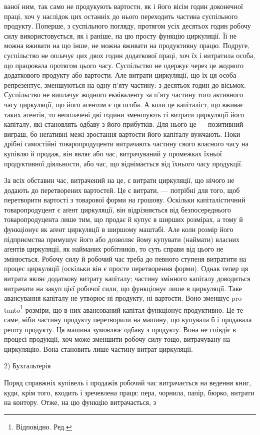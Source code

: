 ваної ним, так само не продукують вартости, як і його вісім годин
доконечної праці, хоч у наслідок цих останніх до нього переходить
частина суспільного продукту. Поперше, з суспільного погляду, протягом
усіх десятьох годин робочу силу використовується, як і раніше, на цю
просту функцію циркуляції. Її не можна вживати на що інше, не
можна вживати на продуктивну працю. Подруге, суспільство не оплачує
цих двох годин додаткової праці, хоч їх і витратила особа, що
працювала протягом цього часу. Суспільство не одержує через це жодного
додаткового продукту або вартости. Але витрати циркуляції, що їх
ця особа репрезентує, зменшуються на одну п’яту частину: з десятьох
годин до вісьмох. Суспільство не виплачує жодного еквіваленту за п’яту
частину того активного часу циркуляції, що його агентом є ця особа.
А коли це капіталіст, що вживає таких агентів, то неоплачені дві години
зменшують ті витрати циркуляції його капіталу, які становлять одбаву з його
прибутків. Для нього це — позитивний виграш, бо неґативні межі зростання
вартости його капіталу вужчають. Поки дрібні самостійні товаропродуценти
витрачають частину свого власного часу на купівлю й продаж,
він являє або час, витрачуваний у промежках їхньої продуктивної
діяльности, або час, що віднімається від їхнього часу продукції.

За всіх обставин час, витрачений на це, є витрати циркуляції, що
нічого не додають до перетворених вартостей. Це є витрати, — потрібні
для того, щоб перетворити вартості з товарової форми на грошову.
Оскільки капіталістичний товаропродуцент є аґент циркуляції, він відрізняється
від безпосереднього товаропродуцента лише тим, що продає й
купує в ширших розмірах, а тому й функціонує як аґент циркуляції в
ширшому маштабі. Але коли розмір його підприємства примушує його
або дозволяє йому купувати (наймати) власних аґентів циркуляції, як
найманих робітників, то суть справи від цього не змінюється. Робочу
силу й робочий час треба до певного ступеня витратити на процес циркуляції
(оскільки він є просте перетворення форми). Однак тепер ця витрата
являє додаткову витрату капіталу; частину змінного капіталу доводиться
витрачати на закуп цієї робочої сили, що функціонує лише в
циркуляції. Таке авансування капіталу не утворює ні продукту, ні
вартости. Воно зменшує pro tanto\footnote*{
Відповідно. Ред.
} розміри, що в них авансований
капітал функціонує продуктивно. Це те саме, ніби частину продукту
перетворили на машину, що купувала б і продавала решту продукту. Ця
машина зумовлює одбаву з продукту. Вона не співдіє в процесі продукції,
хоч може зменшити робочу силу тощо, витрачувану на циркуляцію.
Вона становить лише частину витрат циркуляції.

2) Бухгальтерія

Поряд справжніх купівель і продажів робочий час витрачається на
ведення книг, куди, крім того, входить і зречевлена праця: пера, чорнила,
папір, бюрко, витрати на контору. Отже, на цю функцію витрачається, з